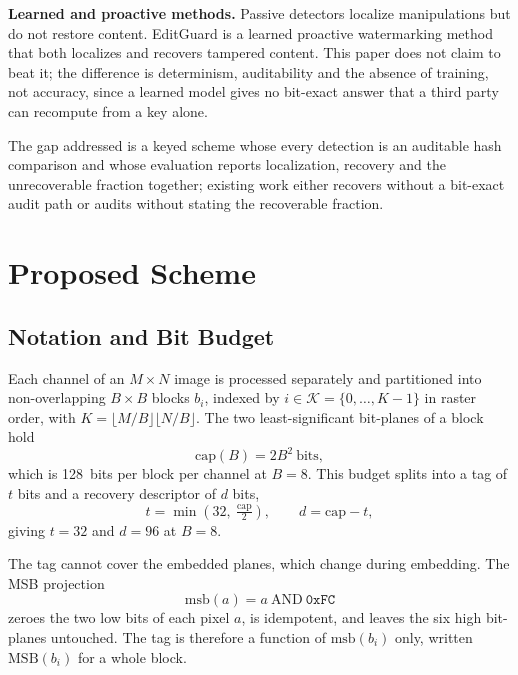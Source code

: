 \documentclass[conference]{IEEEtran}
\begin{document}
\textbf{Learned and proactive methods.} Passive detectors \cite{zhou2018learning,wu2019mantranet} localize manipulations but do not restore content. EditGuard \cite{editguard} is a learned proactive watermarking method that both localizes and recovers tampered content. This paper does not claim to beat it; the difference is determinism, auditability and the absence of training, not accuracy, since a learned model gives no bit-exact answer that a third party can recompute from a key alone.

The gap addressed is a keyed scheme whose every detection is an auditable hash comparison and whose evaluation reports localization, recovery and the unrecoverable fraction together; existing work either recovers without a bit-exact audit path or audits without stating the recoverable fraction.

\section{Proposed Scheme}
\label{sec:method}

\subsection{Notation and Bit Budget}
\label{ssec:budget}
Each channel of an $M\times N$ image is processed separately and partitioned into non-overlapping $B\times B$ blocks $b_i$, indexed by $i\in\mathcal{K}=\{0,\dots,K-1\}$ in raster order, with $K=\lfloor M/B\rfloor\lfloor N/B\rfloor$. The two least-significant bit-planes of a block hold
\begin{equation}
\mathrm{cap}(B)=2B^{2}\ \text{bits},
\label{eq:cap}
\end{equation}
which is 128~bits per block per channel at $B=8$. This budget splits into a tag of $t$ bits and a recovery descriptor of $d$ bits,
\begin{equation}
t=\min\!\left(32,\ \tfrac{\mathrm{cap}}{2}\right),\qquad d=\mathrm{cap}-t,
\label{eq:split}
\end{equation}
giving $t=32$ and $d=96$ at $B=8$.

The tag cannot cover the embedded planes, which change during embedding. The MSB projection
\begin{equation}
\mathrm{msb}(a)=a\ \mathrm{AND}\ \mathtt{0xFC}
\label{eq:msb}
\end{equation}
zeroes the two low bits of each pixel $a$, is idempotent, and leaves the six high bit-planes untouched. The tag is therefore a function of $\mathrm{msb}(b_i)$ only, written $\mathrm{MSB}(b_i)$ for a whole block.
\end{document}

